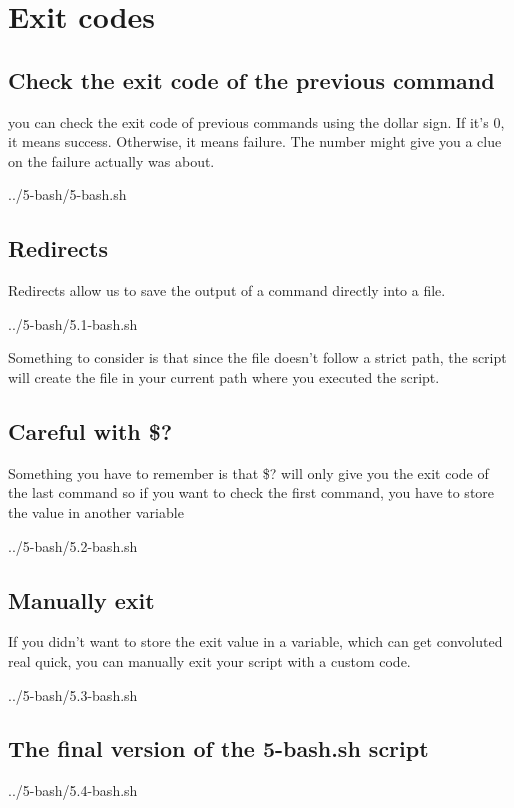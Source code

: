 \chapter{Exit codes}

\section{Check the exit code of the previous command}

you can check the exit code of previous commands using the dollar sign. If it's 0, it means
success. Otherwise, it means failure. The number might give you a clue on the failure actually 
was about.


{../5-bash/5-bash.sh}

\section{Redirects}

Redirects allow us to save the output of a command directly into a file.


{../5-bash/5.1-bash.sh}

Something to consider is that since the file doesn't follow a strict path, the script will create
the file in your current path where you executed the script. 

\section{Careful with \$?}

Something you have to remember is that \$? will only give you the exit code of the last command
so if you want to check the first command, you have to store the value in another variable


{../5-bash/5.2-bash.sh}

\section{Manually exit}

If you didn't want to store the exit value in a variable, which can get convoluted real quick,
you can manually exit your script with a custom code.


{../5-bash/5.3-bash.sh}

\section{The final version of the 5-bash.sh script}


{../5-bash/5.4-bash.sh}
